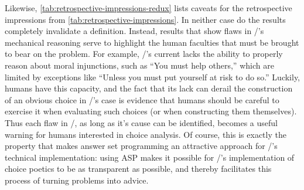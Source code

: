 Likewise, \cref{tab:retrospective-impressions-redux} lists caveats for the retrospective impressions from \cref{tab:retrospective-impressions}.
%
In neither case do the results completely invalidate a definition.
%
Instead, results that show flaws in \dunyazad/'s mechanical reasoning serve to highlight the human faculties that must be brought to bear on the problem.
%
For example, \dunyazad/'s current lacks the ability to properly reason about moral injunctions, such as ``You must help others,'' which are limited by exceptions like ``Unless you must put yourself at risk to do so.''
%
Luckily, humans have this capacity, and the fact that its lack can derail the construction of an obvious choice in \dunyazad/'s case is evidence that humans should be careful to exercise it when evaluating such choices (or when constructing them themselves).
%
Thus each flaw in \dunyazad/, as long as  it's cause can be identified, becomes a useful warning for humans interested in choice analysis.
%
Of course, this is exactly the property that makes answer set programming an attractive approach for \dunyazad/'s technical implementation: using ASP makes it possible for \dunyazad/'s implementation of choice poetics to be as transparent as possible, and thereby facilitates this process of turning problems into advice.


